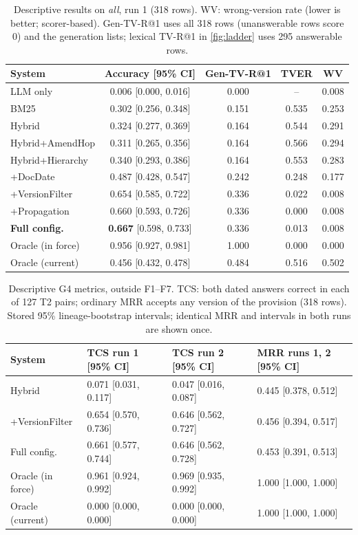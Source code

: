 \documentclass[sigconf,anonymous,review]{acmart}
\begin{document}
\begin{table}[t]
\centering
\caption{Descriptive results on \textit{all}, run 1 (318 rows). WV: wrong-version rate (lower is better; scorer-based). Gen-TV-R@1 uses all 318 rows (unanswerable rows score 0) and the generation lists; lexical TV-R@1 in \cref{fig:ladder} uses 295 answerable rows.}
\label{tab:main}
\setlength{\tabcolsep}{3.5pt}
\footnotesize
\begin{tabular}{@{}l c c c c@{}}
\toprule
System & Accuracy [95\% CI] & Gen-TV-R@1 & TVER & WV \\
\midrule
LLM only & 0.006 [0.000, 0.016] & 0.000 & -- & 0.008 \\
BM25 & 0.302 [0.256, 0.348] & 0.151 & 0.535 & 0.253 \\
Hybrid & 0.324 [0.277, 0.369] & 0.164 & 0.544 & 0.291 \\
Hybrid+AmendHop & 0.311 [0.265, 0.356] & 0.164 & 0.566 & 0.294 \\
Hybrid+Hierarchy & 0.340 [0.293, 0.386] & 0.164 & 0.553 & 0.283 \\
+DocDate & 0.487 [0.428, 0.547] & 0.242 & 0.248 & 0.177 \\
+VersionFilter & 0.654 [0.585, 0.722] & 0.336 & 0.022 & 0.008 \\
+Propagation & 0.660 [0.593, 0.726] & 0.336 & 0.000 & 0.008 \\
\textbf{Full config.} & \textbf{0.667} [0.598, 0.733] & 0.336 & 0.013 & 0.008 \\
\midrule
Oracle (in force) & 0.956 [0.927, 0.981] & 1.000 & 0.000 & 0.000 \\
Oracle (current) & 0.456 [0.432, 0.478] & 0.484 & 0.516 & 0.502 \\
\bottomrule
\end{tabular}
\end{table}

\begin{table}[t]
\centering
\caption{Descriptive G4 metrics, outside F1--F7. TCS: both dated answers correct in each of 127 T2 pairs; ordinary MRR accepts any version of the provision (318 rows). Stored 95\% lineage-bootstrap intervals; identical MRR and intervals in both runs are shown once.}
\label{tab:tcs}
\setlength{\tabcolsep}{1.5pt}
\scriptsize
\begin{tabular}{@{}l l l l@{}}
\toprule
System & TCS run 1 [95\% CI] & TCS run 2 [95\% CI] & MRR runs 1, 2 [95\% CI] \\
\midrule
Hybrid & 0.071 [0.031, 0.117] & 0.047 [0.016, 0.087] & 0.445 [0.378, 0.512] \\
+VersionFilter & 0.654 [0.570, 0.736] & 0.646 [0.562, 0.727] & 0.456 [0.394, 0.517] \\
Full config. & 0.661 [0.577, 0.744] & 0.646 [0.562, 0.728] & 0.453 [0.391, 0.513] \\
Oracle (in force) & 0.961 [0.924, 0.992] & 0.969 [0.935, 0.992] & 1.000 [1.000, 1.000] \\
Oracle (current) & 0.000 [0.000, 0.000] & 0.000 [0.000, 0.000] & 1.000 [1.000, 1.000] \\
\bottomrule
\end{tabular}
\end{table}
\end{document}
